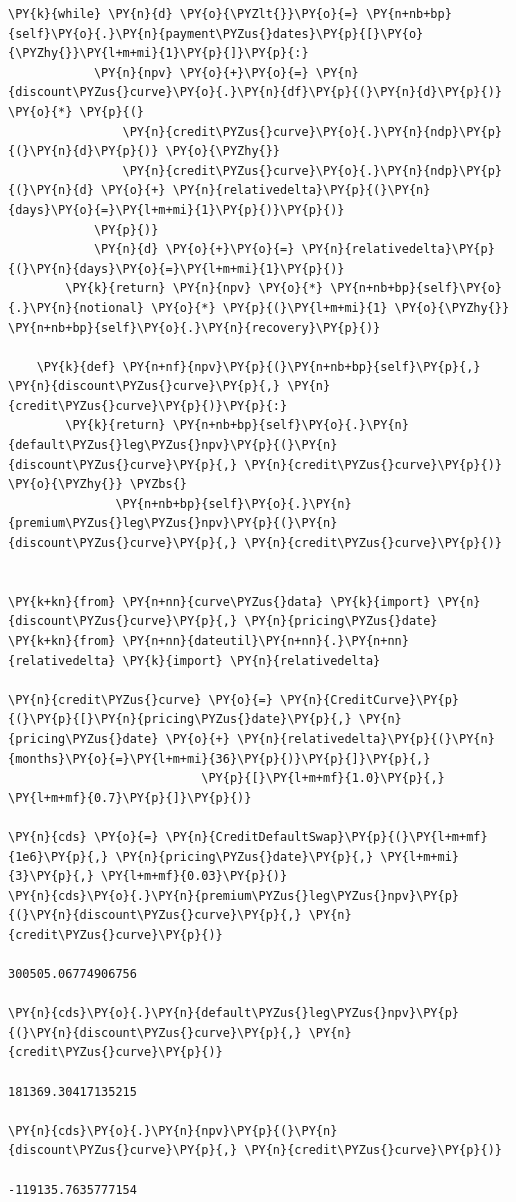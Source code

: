 \begin{tcolorbox}[breakable, size=fbox, boxrule=1pt, pad at break*=1mm,colback=cellbackground, colframe=cellborder]
\begin{Verbatim}[commandchars=\\\{\}]
        \PY{k}{while} \PY{n}{d} \PY{o}{\PYZlt{}}\PY{o}{=} \PY{n+nb+bp}{self}\PY{o}{.}\PY{n}{payment\PYZus{}dates}\PY{p}{[}\PY{o}{\PYZhy{}}\PY{l+m+mi}{1}\PY{p}{]}\PY{p}{:}
            \PY{n}{npv} \PY{o}{+}\PY{o}{=} \PY{n}{discount\PYZus{}curve}\PY{o}{.}\PY{n}{df}\PY{p}{(}\PY{n}{d}\PY{p}{)} \PY{o}{*} \PY{p}{(}
                \PY{n}{credit\PYZus{}curve}\PY{o}{.}\PY{n}{ndp}\PY{p}{(}\PY{n}{d}\PY{p}{)} \PY{o}{\PYZhy{}}
                \PY{n}{credit\PYZus{}curve}\PY{o}{.}\PY{n}{ndp}\PY{p}{(}\PY{n}{d} \PY{o}{+} \PY{n}{relativedelta}\PY{p}{(}\PY{n}{days}\PY{o}{=}\PY{l+m+mi}{1}\PY{p}{)}\PY{p}{)}
            \PY{p}{)}
            \PY{n}{d} \PY{o}{+}\PY{o}{=} \PY{n}{relativedelta}\PY{p}{(}\PY{n}{days}\PY{o}{=}\PY{l+m+mi}{1}\PY{p}{)}
        \PY{k}{return} \PY{n}{npv} \PY{o}{*} \PY{n+nb+bp}{self}\PY{o}{.}\PY{n}{notional} \PY{o}{*} \PY{p}{(}\PY{l+m+mi}{1} \PY{o}{\PYZhy{}} \PY{n+nb+bp}{self}\PY{o}{.}\PY{n}{recovery}\PY{p}{)}
    
    \PY{k}{def} \PY{n+nf}{npv}\PY{p}{(}\PY{n+nb+bp}{self}\PY{p}{,} \PY{n}{discount\PYZus{}curve}\PY{p}{,} \PY{n}{credit\PYZus{}curve}\PY{p}{)}\PY{p}{:}
        \PY{k}{return} \PY{n+nb+bp}{self}\PY{o}{.}\PY{n}{default\PYZus{}leg\PYZus{}npv}\PY{p}{(}\PY{n}{discount\PYZus{}curve}\PY{p}{,} \PY{n}{credit\PYZus{}curve}\PY{p}{)} \PY{o}{\PYZhy{}} \PYZbs{}
               \PY{n+nb+bp}{self}\PY{o}{.}\PY{n}{premium\PYZus{}leg\PYZus{}npv}\PY{p}{(}\PY{n}{discount\PYZus{}curve}\PY{p}{,} \PY{n}{credit\PYZus{}curve}\PY{p}{)}


\PY{k+kn}{from} \PY{n+nn}{curve\PYZus{}data} \PY{k}{import} \PY{n}{discount\PYZus{}curve}\PY{p}{,} \PY{n}{pricing\PYZus{}date}
\PY{k+kn}{from} \PY{n+nn}{dateutil}\PY{n+nn}{.}\PY{n+nn}{relativedelta} \PY{k}{import} \PY{n}{relativedelta}
        
\PY{n}{credit\PYZus{}curve} \PY{o}{=} \PY{n}{CreditCurve}\PY{p}{(}\PY{p}{[}\PY{n}{pricing\PYZus{}date}\PY{p}{,} \PY{n}{pricing\PYZus{}date} \PY{o}{+} \PY{n}{relativedelta}\PY{p}{(}\PY{n}{months}\PY{o}{=}\PY{l+m+mi}{36}\PY{p}{)}\PY{p}{]}\PY{p}{,} 
                           \PY{p}{[}\PY{l+m+mf}{1.0}\PY{p}{,} \PY{l+m+mf}{0.7}\PY{p}{]}\PY{p}{)}
        
\PY{n}{cds} \PY{o}{=} \PY{n}{CreditDefaultSwap}\PY{p}{(}\PY{l+m+mf}{1e6}\PY{p}{,} \PY{n}{pricing\PYZus{}date}\PY{p}{,} \PY{l+m+mi}{3}\PY{p}{,} \PY{l+m+mf}{0.03}\PY{p}{)}
\PY{n}{cds}\PY{o}{.}\PY{n}{premium\PYZus{}leg\PYZus{}npv}\PY{p}{(}\PY{n}{discount\PYZus{}curve}\PY{p}{,} \PY{n}{credit\PYZus{}curve}\PY{p}{)}

300505.06774906756

\PY{n}{cds}\PY{o}{.}\PY{n}{default\PYZus{}leg\PYZus{}npv}\PY{p}{(}\PY{n}{discount\PYZus{}curve}\PY{p}{,} \PY{n}{credit\PYZus{}curve}\PY{p}{)}

181369.30417135215

\PY{n}{cds}\PY{o}{.}\PY{n}{npv}\PY{p}{(}\PY{n}{discount\PYZus{}curve}\PY{p}{,} \PY{n}{credit\PYZus{}curve}\PY{p}{)}

-119135.7635777154
\end{Verbatim}
\end{tcolorbox}    


